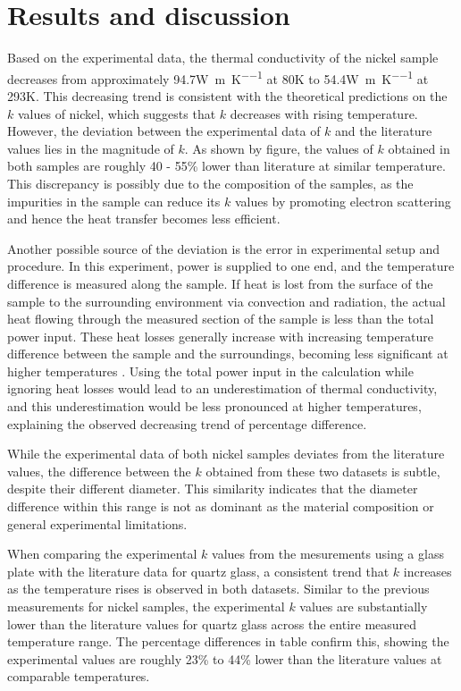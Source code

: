 \documentclass[a4paper,12pt]{article}
\begin{document}
\section{Results and discussion}
\label{sec:results}
Based on the experimental data, the thermal conductivity of the nickel sample decreases from approximately 94.7\si{\watt\per\meter\per\kelvin} at 80\si{\kelvin} to 54.4\si{\watt\per\meter\per\kelvin} at 293\si{\kelvin}. This decreasing trend is consistent with the theoretical predictions on the $k$ values of nickel, which suggests that $k$ decreases with rising temperature. However, the deviation between the experimental data of $k$ and the literature values lies in the magnitude of $k$. As shown by figure, the values of $k$ obtained in both samples are roughly 40 - 55\% lower than literature at similar temperature. This discrepancy is possibly due to the composition of the samples, as the impurities in the sample can reduce its $k$ values by promoting electron scattering \autocite{chen2021effects} and hence the heat transfer becomes less efficient.\par
Another possible source of the deviation is the error in experimental setup and procedure. In this experiment, power is supplied to one end, and the temperature difference is measured along the sample. If heat is lost from the surface of the sample to the surrounding environment via convection and radiation, the actual heat flowing through the measured section of the sample is less than the total power input. These heat losses generally increase with increasing temperature difference between the sample and the surroundings, becoming less significant at higher temperatures \autocite{corsan1992axial}. Using the total power input in the calculation while ignoring heat losses would lead to an underestimation of thermal conductivity, and this underestimation would be less pronounced at higher temperatures, explaining the observed decreasing trend of percentage difference.\par
While the experimental data of both nickel samples deviates from the literature values, the difference between the $k$ obtained from these two datasets is subtle, despite their different diameter. This similarity indicates that the diameter difference within this range is not as dominant as the material composition or general experimental limitations.\par
When comparing the experimental $k$ values from the mesurements using a glass plate with the literature data for quartz glass, a consistent trend that $k$ increases as the temperature rises is observed in both datasets. Similar to the previous measurements for nickel samples, the experimental $k$ values are substantially lower than the literature values for quartz glass across the entire measured temperature range. The percentage differences in table confirm this, showing the experimental values are roughly 23\% to 44\% lower than the literature values at comparable temperatures.\par
\end{document}

